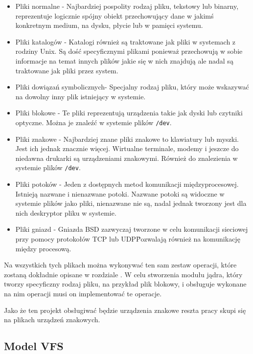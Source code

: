 \documentclass[10pt]{article}
\begin{document}
\begin{itemize}
\itemsep1pt\parskip0pt
\item
  Pliki normalne - Najbardziej pospolity rodzaj pliku, tekstowy lub binarny, reprezentuje logicznie spójny obiekt przechowujący dane w jakimś konkretnym medium, na dysku, płycie lub w pamięci systemu.
\item
  Pliki katalogów - Katalogi również są traktowane jak pliki w systemach z rodziny Unix. Są dość specyficznymi plikami ponieważ przechowują w sobie informacje na temat innych plików jakie się w nich znajdują ale nadal są traktowane jak pliki przez system.
\item
  Pliki dowiązań symbolicznych- Specjalny rodzaj pliku, który może wskazywać na dowolny inny plik istniejący w systemie.
\item
  Pliki blokowe - Te pliki reprezentują urządzenia takie jak dyski lub czytniki optyczne. Można je znaleźć w systemie plików \texttt{/dev}.
\item
  Pliki znakowe - Najbardziej znane pliki znakowe to klawiatury lub myszki. Jest ich jednak znacznie więcej. Wirtualne terminale, modemy i jeszcze do niedawna drukarki są urządzeniami znakowymi. Również do znalezienia w systemie plików \texttt{/dev}.
\item
  Pliki potoków - Jeden z dostępnych metod komunikacji międzyprocesowej.  Istnieją nazwane i nienazwane potoki. Nazwane potoki są widoczne w systemie plików jako pliki, nienazwane nie są, nadal jednak tworzony jest dla nich deskryptor pliku w systemie.
\item
  Pliki gniazd - Gniazda BSD zazwyczaj tworzone w celu komunikacji sieciowej przy pomocy protokołów TCP lub UDP\. Pozwalają również na komunikację między procesową.
\end{itemize}

Na wszystkich tych plikach można wykonywać ten sam zestaw operacji, które zostaną dokładnie opisane w rozdziale . W celu stworzenia modułu jądra, który tworzy specyficzny rodzaj pliku, na przykład plik blokowy, i obsługuje wykonane na nim operacji musi on implementować te operacje.

Jako że ten projekt obsługiwać będzie urządzenia znakowe reszta pracy skupi się na plikach urządzeń znakowych.

\subsection{Model VFS}
\label{vfs}
\end{document}
